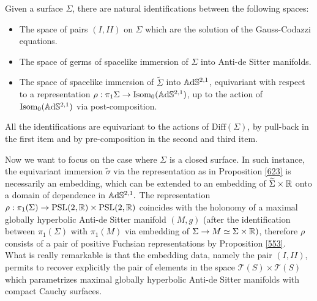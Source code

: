 \begin{proposition}\label{623}
    Given a surface $\Sigma$, there are natural identifications between the following spaces:
    \begin{itemize}
        \item The space of pairs $(I,II)$ on $\Sigma$ which are the solution of the Gauss-Codazzi equations. 
        \item The space of germs of spacelike immersion of $\Sigma$ into Anti-de Sitter manifolds. 
        \item The space of spacelike immersion of $\widetilde{\Sigma}$ into $\mathbb{A}\mathrm{d}\mathbb{S}^{2,1}$, equivariant with respect to a representation $\rho: \pi_1\Sigma\to \text{Isom}_0(\mathbb{A}\mathrm{d}\mathbb{S}^{2,1})$, up to the action of $\text{Isom}_{0}(\mathbb{A}\mathrm{d}\mathbb{S}^{2,1})$ via post-composition. 
    \end{itemize}
    All the identifications are equivariant to the actions of $\text{Diff}(\Sigma)$, by pull-back in the first item and by pre-composition in the second and third item.
\end{proposition}

Now we want to focus on the case where $\Sigma$ is a closed surface. In such instance, the equivariant immersion $\widetilde{\sigma}$ via the representation as in Proposition \ref{623} is necessarily an embedding, which can be extended to an embedding of $\widetilde{\Sigma}\times\mathbb{R}$ onto a domain of dependence in $\mathbb{A}\mathrm{d}\mathbb{S}^{2,1}.$
The representation $\rho:\pi_1(\Sigma)\to\text{PSL}(2,\mathbb{R})\times\text{PSL}(2,\mathbb{R})$ coincides with the holonomy of a maximal globally hyperbolic Anti-de Sitter manifold $(M,g)$ (after the identification between $\pi_1(\Sigma)$ with $\pi_1(M)$ via embedding of $\Sigma\to M\simeq\Sigma\times\mathbb{R})$, therefore $\rho$ consists of a pair of positive Fuchsian representations by Proposition \ref{553}. \\ 
What is really remarkable is that the embedding data, namely the pair $(I,II)$, permits to recover explicitly the pair of elements in the space $\mathcal{T}(S)\times\mathcal{T}(S)$ which parametrizes maximal globally hyperbolic Anti-de Sitter manifolds with compact Cauchy surfaces.

